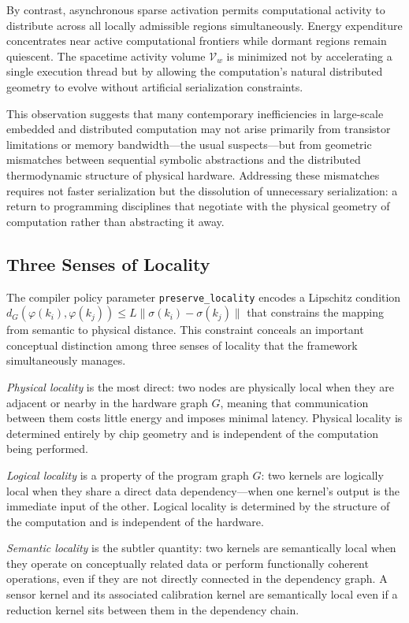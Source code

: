 \documentclass[11pt, a4paper]{article}
\begin{document}
By contrast, asynchronous sparse activation permits computational activity to
distribute across all locally admissible regions simultaneously. Energy expenditure
concentrates near active computational frontiers while dormant regions remain
quiescent. The spacetime activity volume $\mathcal{V}_w$ is minimized not by
accelerating a single execution thread but by allowing the computation's natural
distributed geometry to evolve without artificial serialization constraints.

This observation suggests that many contemporary inefficiencies in large-scale
embedded and distributed computation may not arise primarily from transistor
limitations or memory bandwidth---the usual suspects---but from geometric mismatches
between sequential symbolic abstractions and the distributed thermodynamic structure
of physical hardware. Addressing these mismatches requires not faster serialization
but the dissolution of unnecessary serialization: a return to programming disciplines
that negotiate with the physical geometry of computation rather than abstracting it away.

\subsection{Three Senses of Locality}

The compiler policy parameter \texttt{preserve\_locality} encodes a Lipschitz
condition $d_G(\varphi(k_i), \varphi(k_j)) \leq L \|\sigma(k_i) - \sigma(k_j)\|$
that constrains the mapping from semantic to physical distance. This constraint
conceals an important conceptual distinction among three senses of locality that
the framework simultaneously manages.

\emph{Physical locality} is the most direct: two nodes are physically local when
they are adjacent or nearby in the hardware graph $G$, meaning that communication
between them costs little energy and imposes minimal latency. Physical locality is
determined entirely by chip geometry and is independent of the computation being performed.

\emph{Logical locality} is a property of the program graph $G$: two kernels are
logically local when they share a direct data dependency---when one kernel's output
is the immediate input of the other. Logical locality is determined by the structure
of the computation and is independent of the hardware.

\emph{Semantic locality} is the subtler quantity: two kernels are semantically local
when they operate on conceptually related data or perform functionally coherent
operations, even if they are not directly connected in the dependency graph.
A sensor kernel and its associated calibration kernel are semantically local even if
a reduction kernel sits between them in the dependency chain.
\end{document}
